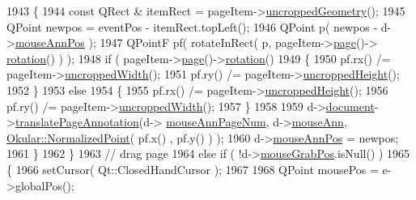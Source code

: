 \begin{DoxyCode}
1943                     \{
1944                         \textcolor{keyword}{const} QRect & itemRect = pageItem->\hyperlink{classPageViewItem_a5d2e73a003f65b4e95c0c21b1698f835}{uncroppedGeometry}();
1945                         QPoint newpos = eventPos - itemRect.topLeft();
1946                         QPoint p( newpos - d->\hyperlink{classPageViewPrivate_a1cc45a684f1f05e522c4874d017858cb}{mouseAnnPos} );
1947                         QPointF pf( rotateInRect( p, pageItem->\hyperlink{classPageViewItem_a5c512d95e5563e8d19d1fb3d93dafc31}{page}()->
      \hyperlink{classOkular_1_1Page_a731947e32744bdcda791d22a2dc88726}{rotation}() ) );
1948                         \textcolor{keywordflow}{if} ( pageItem->\hyperlink{classPageViewItem_a5c512d95e5563e8d19d1fb3d93dafc31}{page}()->\hyperlink{classOkular_1_1Page_a731947e32744bdcda791d22a2dc88726}{rotation}() %
1949                         \{
1950                             pf.rx() /= pageItem->\hyperlink{classPageViewItem_a240924407ae22bb0489363a6a2d481b9}{uncroppedWidth}();
1951                             pf.ry() /= pageItem->\hyperlink{classPageViewItem_af1380fce5dc13a72458ef834c720b128}{uncroppedHeight}();
1952                         \}
1953                         \textcolor{keywordflow}{else}
1954                         \{
1955                             pf.rx() /= pageItem->\hyperlink{classPageViewItem_af1380fce5dc13a72458ef834c720b128}{uncroppedHeight}();
1956                             pf.ry() /= pageItem->\hyperlink{classPageViewItem_a240924407ae22bb0489363a6a2d481b9}{uncroppedWidth}();
1957                         \}
1958 
1959                         d->\hyperlink{classPageViewPrivate_a50645b9853306cffd74e51efb677e5b4}{document}->\hyperlink{classOkular_1_1Document_ab3ca55619ce1a60a4d60913a216ae01c}{translatePageAnnotation}(d->
      \hyperlink{classPageViewPrivate_a6e1d17de5ec97192d937dae41c89ff74}{mouseAnnPageNum}, d->\hyperlink{classPageViewPrivate_ac92373de9a9cb5f2085b186a7e321a3b}{mouseAnn}, \hyperlink{classOkular_1_1NormalizedPoint}{Okular::NormalizedPoint}( pf.x()
      , pf.y() ) );
1960                         d->\hyperlink{classPageViewPrivate_a1cc45a684f1f05e522c4874d017858cb}{mouseAnnPos} = newpos;
1961                     \}
1962                 \}
1963                 \textcolor{comment}{// drag page}
1964                 \textcolor{keywordflow}{else} \textcolor{keywordflow}{if} ( !d->\hyperlink{classPageViewPrivate_aa02b40a75cef0ee7f1b423027a80c8d6}{mouseGrabPos}.isNull() )
1965                 \{
1966                     setCursor( Qt::ClosedHandCursor );
1967 
1968                     QPoint mousePos = e->globalPos();

\end{DoxyCode}
